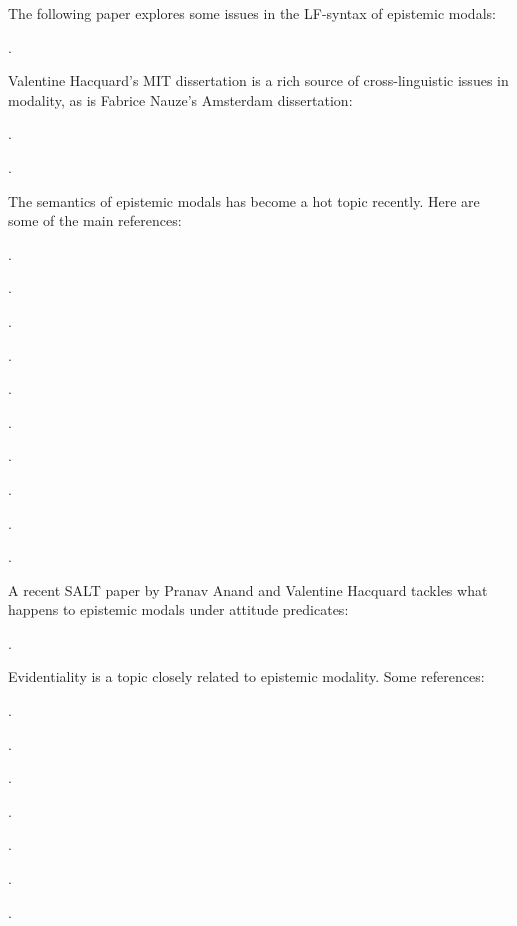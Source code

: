 {The following paper explores some issues in the LF-syntax of epistemic
modals:

\begin{bibentrylist}
	\item {}.
\end{bibentrylist}

Valentine Hacquard's MIT dissertation is a rich source of
cross-linguistic issues in modality, as is Fabrice Nauze's Amsterdam
dissertation:

\begin{bibentrylist}
  \item{}.
  \item {}.
\end{bibentrylist}

The semantics of epistemic modals has become a hot topic recently.
Here are some of the main references:

\begin{bibentrylist}
	\item {}.
	\item {}.
	\item {}. 
	\item {}. 
	\item {}. 
	\item {}. 	
	\item {}.
	\item {}.
	\item {}.
	\item {}. 
\end{bibentrylist}

A recent SALT paper by Pranav Anand and Valentine Hacquard tackles
what happens to epistemic modals under attitude predicates:

\begin{bibentrylist}
	\item {}.
\end{bibentrylist}

Evidentiality is a topic closely related to epistemic modality. Some
references:

\begin{bibentrylist}
  \item {}.
  \item {}.
  \item {}.
  \item {}.
  \item {}.
  \item {}.
  \item {}. 
\end{bibentrylist}

}
